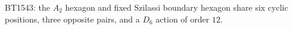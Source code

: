 \begin{center}\small
BT1543: the $A_2$ hexagon and fixed Szilassi boundary hexagon share six cyclic positions, three opposite pairs, and a $D_6$ action of order $12$.
\end{center}
